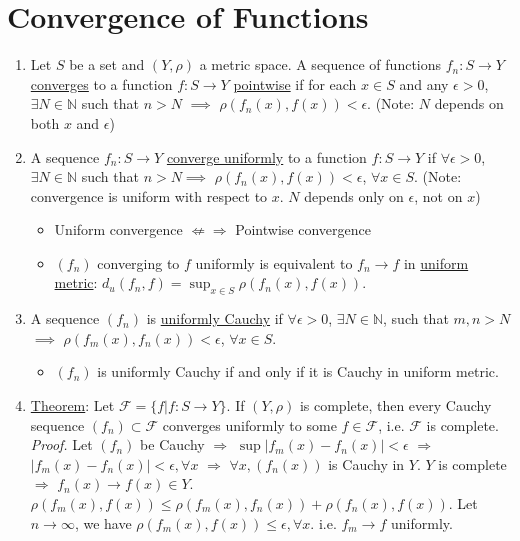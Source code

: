 \documentclass[%
 aip,
 jmp,%
 amsmath,amssymb,
 reprint,%
]{revtex4-1}
\def\N{{\mathbb N}}
\def\e{\epsilon}
\def\F{{\mathcal F}}
\renewenvironment{proof}{\color{gray}\footnotesize\emph{Proof.}}{}
\newcommand{\defn}[1]{\underline{#1}}
\begin{document}
\section{Convergence of Functions}
\begin{enumerate}
    \item Let $S$ be a set and $(Y,\rho)$ a metric space. A sequence of functions
    $f_n : S \to Y$ \defn{converges} to a function $f: S \to Y$ \defn{pointwise}
    if for each $x\in S$ and any $\e>0$, $\exists N\in\N$ such that $n>N$ $\implies$
    $\rho(f_n(x), f(x)) < \e$.
    {\footnotesize\color{gray} (Note: $N$ depends on both $x$ and $\e$) }

    \item A sequence $f_n: S \to Y$ \defn{converge uniformly} to a function
    $f: S \to Y$ if $\forall\e>0$, $\exists N\in\N$ such that $n>N \implies$
    $\rho(f_n(x), f(x)) < \e$, $\forall x\in S$.
    {\footnotesize\color{gray} (Note: convergence is uniform with respect to $x$.
    $N$ depends only on $\e$, not on $x$)}
        \begin{itemize}
            \item Uniform convergence $\not\Leftarrow\Rightarrow$ Pointwise convergence
            \item $(f_n)$ converging to $f$ uniformly is equivalent to $f_n \to f$
            in \defn{uniform metric}: $d_u(f_n,f) = \sup_{x\in S}\rho(f_n(x), f(x))$.
        \end{itemize}

    \item A sequence $(f_n)$ is \defn{uniformly Cauchy} if $\forall\e>0$, $\exists N\in\N$,
    such that $m,n>N$ $\implies$ $\rho(f_m(x), f_n(x)) < \e$, $\forall x\in S$.
        \begin{itemize}
            \item $(f_n)$ is uniformly Cauchy if and only if it is Cauchy in
            uniform metric.
        \end{itemize}

    \item \defn{Theorem}: Let $\F = \{f| f: S \to Y\}$. If $(Y,\rho)$ is complete,
    then every Cauchy sequence $(f_n)\subset\F$ converges uniformly to some $f\in\F$,
    i.e. $\F$ is complete. \\
    \begin{proof}
        Let $(f_n)$ be Cauchy $\Rightarrow$ $\sup |f_m(x) - f_n(x)| < \e$
                       $\Rightarrow$ $|f_m(x) - f_n(x)| < \e, \forall x$
                       $\Rightarrow$ $\forall x, (f_n(x))$ is Cauchy in $Y$.
        $Y$ is complete $\Rightarrow$ $f_n(x) \to f(x) \in Y$.
        $\rho(f_m(x), f(x)) \le \rho(f_m(x), f_n(x)) + \rho(f_n(x),f(x))$.
        Let $n\to\infty$, we have $\rho(f_m(x), f(x))\le\e,\forall x$.
        i.e. $f_m\to f$ uniformly.
    \end{proof}


\end{enumerate}
\end{document}
